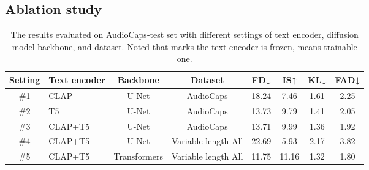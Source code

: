 \documentclass{article}
\begin{document}
\subsection{Ablation study}

\begin{table}[!h]
\centering
\caption{The results evaluated on AudioCaps-test set with different settings of text encoder, diffusion model backbone, and dataset. Noted that  marks the text encoder is frozen,  means trainable one.}
\label{tab:ablation}\small
    \begin{tabular}{c|lcccccc}
    \toprule
    Setting & Text encoder & Backbone & Dataset & FD↓    & IS↑    & KL↓    & FAD↓ \\
    \midrule
    \#1 & CLAP & U-Net  & AudioCaps & 18.24  & 7.46   & 1.61   & 2.25 \\
    \#2 & T5  & U-Net  & AudioCaps & 13.73  & 9.79   & 1.41   & 2.05 \\
    \#3 & CLAP+T5 & U-Net  & AudioCaps & 13.71  & 9.99   & 1.36   & 1.92 \\
    \#4 & CLAP+T5 & U-Net  & Variable length All & 22.69  & 5.93   & 2.17   & 3.82 \\
    \#5 & CLAP+T5 & Transformers & Variable length All & 11.75  & 11.16  & 1.32   & 1.80 \\
    \bottomrule
    \end{tabular}\end{table}
\end{document}
